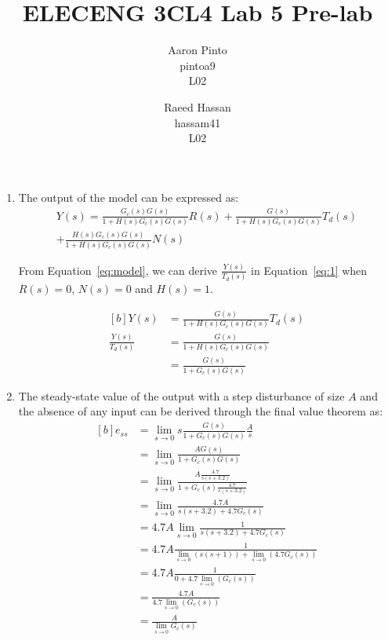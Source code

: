 \documentclass[12pt]{article}
\title{ELECENG 3CL4 Lab 5 Pre-lab}
\author{
    Aaron Pinto \\
    pintoa9 \\
    L02
    \and
    Raeed Hassan \\
    hassam41 \\
    L02
}
\begin{document}
\maketitle
\clearpage

\begin{enumerate}
	\item %
	The output of the model can be expressed as:
	\begin{multline} \label{eq:model}
        Y(s) = \frac{G_c(s)G(s)}{1+H(s)G_c(s)G(s)}R(s) + \frac{G(s)}{1+H(s)G_c(s)G(s)}T_d(s) \\ + \frac{H(s)G_c(s)G(s)}{1+H(s)G_c(s)G(s)}N(s)
    \end{multline}
	
	From Equation~\ref{eq:model}, we can derive $\frac{Y(s)}{T_d(s)}$ in Equation~\ref{eq:1} when $R(s) = 0$, $N(s) = 0$ and $H(s) = 1$.

	\begin{equation} \label{eq:1}
	\begin{aligned}[b]
		Y(s) &= \frac{G(s)}{1+H(s)G_c(s)G(s)}T_d(s) \\
		\frac{Y(s)}{T_d(s)} &= \frac{G(s)}{1+H(s)G_c(s)G(s)} \\
		&= \frac{G(s)}{1+G_c(s)G(s)}
	\end{aligned}
	\end{equation}

	\item %
	The steady-state value of the output with a step disturbance of size $A$ and the absence of any input can be derived through the final value theorem as:
	\begin{equation} \label{eq:2}
	\begin{aligned}[b]
		e_{ss} &= \lim_{s \to 0} s \frac{G(s)}{1+G_c(s)G(s)} \frac{A}{s} \\
		&= \lim_{s \to 0} \frac{AG(s)}{1+G_c(s)G(s)} \\
		&= \lim_{s \to 0} \frac{A \frac{4.7}{s(s+3.2)}}{1 + G_c(s) \frac{4.7}{s(s+3.2)}} \\
		&= \lim_{s \to 0} \frac{4.7 A}{s(s+3.2) + 4.7 G_c(s)} \\
		&= 4.7 A \lim_{s \to 0} \frac{1}{s(s+3.2) + 4.7 G_c(s)} \\
		&= 4.7 A \frac{1}{\lim_{s \to 0}\left( s(s+1) \right) + \lim_{s \to 0}(4.7G_c(s))} \\
		&= 4.7 A \frac{1}{0 + 4.7 \lim_{s \to 0}\left(G_c(s)\right)} \\
		&= \frac{4.7 A}{4.7 \lim_{s \to 0}\left(G_c(s)\right)} \\
		&= \frac{A}{\lim_{s \to 0}G_c(s)}
	\end{aligned}
	\end{equation}
	

\end{enumerate}
\end{document}
